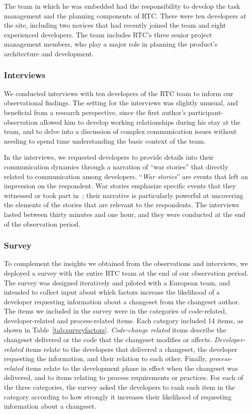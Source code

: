 \documentclass{sig-alternate}
\begin{document}
The team in which he was embedded had the responsibility to develop the task management and the planning components of RTC. There were ten developers at the site, including two novices that had recently joined the team and eight experienced developers. The team includes RTC's three senior project management members, who play a major role in planning the product's architecture and development.


\subsubsection{Interviews}

We conducted interviews with ten developers of the RTC team to inform our observational findings. The setting for the interviews was slightly unusual, and beneficial from a research perspective, since the first author's participant-observation allowed him to develop working relationships during his stay at the team, and to delve into a discussion of complex communication issues without needing to spend time understanding the basic context of the team.

In the interviews, we requested developers to provide details into their communication dynamics through a narration of ``war stories'' that directly related to communication among developers. ``\emph{War stories}'' are events that left an impression on the respondent. War stories emphasize specific events that they witnessed or took part in~\cite{lutters:ist:2007}; their narrative is particularly powerful at uncovering the elements of the stories that are relevant to the respondents. The interviews lasted between thirty minutes and one hour, and they were conducted at the end of the observation period. 


\subsubsection{Survey}

To complement the insights we obtained from the observations and interviews, we deployed a survey with the entire RTC team at the end of our observation period. The survey was designed iteratively and piloted with a European team, and intended to collect input about which factors increase the likelihood of a developer requesting information about a changeset from the changeset author. The items we included in the survey were in the categories of code-related, developer-related and process-related items. Each category included 14 items, as shown in Table~\ref{tab:surveyfactors}. \emph{Code-change related} items describe the changeset delivered or the code that the changeset modifies or affects. \emph{Developer-related} items relate to
the developers that delivered a changeset, the developer requesting the
information, and their relation to each other. Finally, \emph{process-related} items relate to the development phase in effect when the changeset was delivered, and to items relating to process requirements or practices. For each of the three categories, the survey asked the developers to rank each item in the category according to how strongly it increases their likelihood of requesting information about a changeset. 
\end{document}
